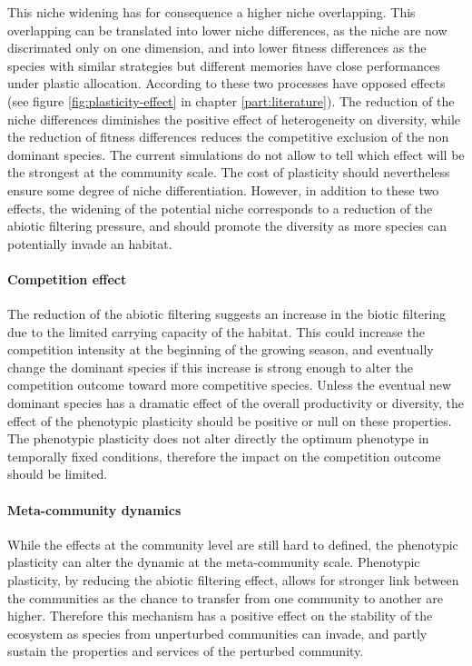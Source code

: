 This niche widening has for consequence a higher niche overlapping. This overlapping can be translated into lower niche differences, as the niche are now discrimated only on one dimension, and into lower fitness differences as the species with similar strategies but different memories have close performances under plastic allocation. According to \cite{turcotte_phenotypic_2016} these two processes have opposed effects (see figure \ref{fig:plasticity-effect} in chapter \ref{part:literature}). The reduction of the niche differences diminishes the positive effect of heterogeneity on diversity, while the reduction of fitness differences reduces the competitive exclusion of the non dominant species. The current simulations do not allow to tell which effect will be the strongest at the community scale. The cost of plasticity should nevertheless ensure some degree of niche differentiation. However, in addition to these two effects, the widening of the potential niche corresponds to a reduction of the abiotic filtering pressure, and should promote the diversity as more species can potentially invade an habitat. 

\paragraph{Competition effect}

The reduction of the abiotic filtering suggests an increase in the biotic filtering due to the limited carrying capacity of the habitat. This could increase the competition intensity at the beginning of the growing season, and eventually change the dominant species if this increase is strong enough to alter the competition outcome toward more competitive species. Unless the eventual new dominant species has a dramatic effect of the overall productivity or diversity, the effect of the phenotypic plasticity should be positive or null on these properties. The phenotypic plasticity does not alter directly the optimum phenotype in temporally fixed conditions, therefore the impact on the competition outcome should be limited.

\paragraph{Meta-community dynamics}

While the effects at the community level are still hard to defined, the phenotypic plasticity can alter the dynamic at the meta-community scale. Phenotypic plasticity, by reducing the abiotic filtering effect, allows for stronger link between the communities as the chance to transfer from one community to another are higher. Therefore this mechanism has a positive effect on the stability of the ecosystem as species from unperturbed communities can invade, and partly sustain the properties and services of the perturbed community.

